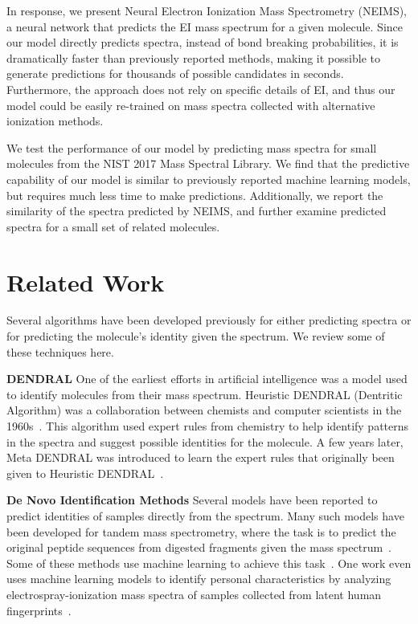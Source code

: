 \documentclass{article}
\begin{document}
In response, we present Neural Electron Ionization Mass Spectrometry (NEIMS), a neural network that predicts the EI mass spectrum for a given molecule. Since our model directly predicts spectra, instead of bond breaking probabilities, it is dramatically faster than previously reported methods, making it possible to generate predictions for thousands of possible candidates in seconds. Furthermore, the approach does not rely on specific details of EI, and thus our model could be easily re-trained on mass spectra collected with alternative ionization methods.

We test the performance of our model by predicting mass spectra for small molecules from the NIST 2017 Mass Spectral Library. We find that the predictive capability of our model is similar to previously reported machine learning models, but requires much less time to make predictions. Additionally, we report the similarity of the spectra predicted by NEIMS, and further examine predicted spectra for a small set of related molecules.

\section{Related Work}
\label{sec:related-work}
Several algorithms have been developed previously for either predicting spectra or for predicting the molecule's identity given the spectrum. We review some of these techniques here.

\textbf{DENDRAL} One of the earliest efforts in artificial intelligence was a model used to identify molecules from their mass spectrum. Heuristic DENDRAL (Dentritic Algorithm) was a collaboration between chemists and computer scientists in the 1960s~\cite{buchanan1981dendral}. This algorithm used expert rules from chemistry to help identify patterns in the spectra and suggest possible identities for the molecule. A few years later, Meta DENDRAL was introduced to learn the expert rules that originally been given to Heuristic DENDRAL~\cite{lindsay1993dendral}.
    
\textbf{De Novo Identification Methods} Several models have been reported to predict identities of samples directly from the spectrum. Many such models have been developed for tandem mass spectrometry, where the task is to predict the original peptide sequences from digested fragments given the mass spectrum~\cite{Eng1994sequest}. Some of these methods use machine learning to achieve this task~\cite{Tran8247deepnovo, Schoenholtz2018supervision}. One work even uses machine learning models to identify personal characteristics by analyzing electrospray-ionization mass spectra of samples collected from latent human fingerprints~\cite{Zhou2017LatentFingerprints}.
    
\end{document}
